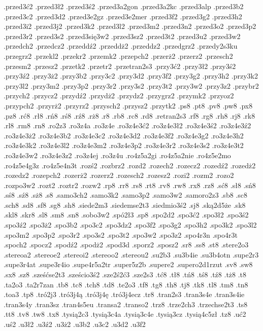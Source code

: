 {.przed3ć2
.przed3ł2
.przed3ś2
.przed3a2gon
.przed3a2kc
.przed3alp
.przed3b2
.przed3c2
.przed3d2
.przed3e2gz
.przed3e2mer
.przed3f2
.przed3g2
.przed3h2
.przed3i2
.przed3j2
.przed3k2
.przed3l2
.przed3m2
.przed3n2
.przed3o2
.przed3p2
.przed3r2
.przed3s2
.przed3się3w2
.przed3sz2
.przed3t2
.przed3u2
.przed3w2
.przedch2
.przedcz2
.przeddź2
.przeddż2
.przeddz2
.przedgrz2
.przedy2s3ku
.przegrz2
.przekl2
.przekr2
.przemk2
.przepch2
.przerż2
.przerz2
.przesch2
.przesm2
.przesz2
.przetk2
.przetr2
.przetran2s3
.przy3ć2
.przy3ł2
.przy3ś2
.przy3ź2
.przy3ż2
.przy3b2
.przy3c2
.przy3d2
.przy3f2
.przy3g2
.przy3h2
.przy3k2
.przy3l2
.przy3m2
.przy3p2
.przy3r2
.przy3s2
.przy3t2
.przy3w2
.przy3z2
.przybr2
.przych2
.przycz2
.przydź2
.przydż2
.przydz2
.przygrz2
.przymk2
.przyoz2
.przypch2
.przyrż2
.przyrz2
.przysch2
.przysz2
.przytk2
.ps8
.pt8
.pv8
.pw8
.px8
.pz8
.rć8
.rł8
.rń8
.rś8
.rź8
.rż8
.r8
.rb8
.rc8
.rd8
.retran2s3
.rf8
.rg8
.rh8
.rj8
.rk8
.rl8
.rm8
.rn8
.ro2z3
.ro3z4a
.ro3z4e
.ro3z4e3ć2
.ro3z4e3ł2
.ro3z4e3ś2
.ro3z4e3ź2
.ro3z4e3ż2
.ro3z4e3b2
.ro3z4e3c2
.ro3z4e3d2
.ro3z4e3f2
.ro3z4e3g2
.ro3z4e3h2
.ro3z4e3k2
.ro3z4e3l2
.ro3z4e3m2
.ro3z4e3p2
.ro3z4e3r2
.ro3z4e3s2
.ro3z4e3t2
.ro3z4e3w2
.ro3z4e3z2
.ro3z4ej
.ro3z4u
.ro4z5a2gi
.ro4z5a2nie
.ro4z5e2mo
.ro4z5e4g3z
.ro4z5e4n3t
.rozś2
.rozbrz2
.rozd2
.rozech2
.rozecz2
.rozedź2
.rozedż2
.rozedz2
.rozepch2
.rozerż2
.rozerz2
.rozesch2
.rozesz2
.rozi2
.rozm2
.rozo2
.rozpo3w2
.rozt2
.roztr2
.rozw2
.rp8
.rr8
.rs8
.rt8
.rv8
.rw8
.rx8
.rz8
.sć8
.sł8
.sń8
.sś8
.sź8
.sż8
.s8
.samo3ch2
.samo3k2
.samo3p2
.samo3w2
.samoro2z3
.sb8
.sc8
.sch8
.sd8
.sf8
.sg8
.sh8
.siede2m3
.siedemse2t3
.siedmio3ś2
.sj8
.ską2d5że
.sk8
.skl8
.skr8
.sl8
.sm8
.sn8
.sobo3w2
.spó2ł3
.sp8
.spo2d2
.spo3ć2
.spo3ł2
.spo3ś2
.spo3ź2
.spo3ż2
.spo3b2
.spo3c2
.spo3dz2
.spo3f2
.spo3g2
.spo3h2
.spo3k2
.spo3l2
.spo3m2
.spo3p2
.spo3r2
.spo3s2
.spo3t2
.spo3w2
.spo3z2
.spo4r3n
.spo4r3t
.spoch2
.spocz2
.spodź2
.spodż2
.spod3d
.sporz2
.sposz2
.sr8
.ss8
.st8
.stere2o3
.stereoa2
.stereoe2
.stereoi2
.stereoo2
.stereou2
.su2b3
.su3b4ie
.su3b4otn
.supe2r3
.supe3r4at
.supe3r4io
.supe4r5a2tr
.super5z2b
.supere2
.supero2d1rzut
.sv8
.sw8
.sx8
.sz8
.sześćse2t3
.sześcio3ś2
.sze2ś2ć3
.sze2s3
.tć8
.tł8
.tń8
.tś8
.tź8
.tż8
.t8
.ta2o3
.ta2r7zan
.tb8
.tc8
.tch8
.td8
.te2o3
.tf8
.tg8
.th8
.tj8
.tk8
.tl8
.tm8
.tn8
.toa3
.tp8
.tró2j3
.tró3j4ą
.tró3j4ę
.tró3j4ecz
.tr8
.tran2s3
.tran3s4e
.tran3s4ie
.tran3s4y
.tran3sz
.tran4s5eu
.transa2
.transo2
.trz8
.trze2ch3
.trzechse2t3
.ts8
.tt8
.tv8
.tw8
.tx8
.tysią2c3
.tysią3c4a
.tysią3c4e
.tysią3cz
.tysią4c5zł
.tz8
.uć2
.uś2
.u3ł2
.u3ź2
.u3ż2
.u3b2
.u3c2
.u3d2
.u3f2
}

